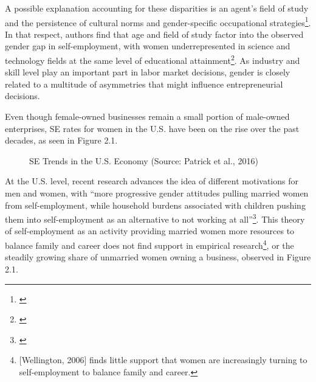 A possible explanation accounting for these disparities is an agent's field of study and the persistence of cultural norms and gender-specific occupational strategies\footnote{\cite{CowlingTaylor2001}}. In that respect, authors find that age and field of study factor into the observed gender gap in self-employment, with women underrepresented in science and technology fields at the same level of educational attainment\footnote{\cite{GeorgellisWall2005}}. As industry and skill level play an important part in labor market decisions, gender is closely related to a multitude of asymmetries that might influence entrepreneurial decisions. 

Even though female-owned businesses remain a small portion of male-owned enterprises, SE rates for women in the U.S. have been on the rise over the past decades, as seen in Figure 2.1. 

\begin{figure}[hbtp]
    \caption{SE Trends in the U.S. Economy (Source: Patrick et al., 2016)} 
\end{figure}

At the U.S. level, recent research advances the idea of different motivations for men and women, with ``more progressive gender attitudes pulling married women from self-employment, while household burdens associated with children pushing them into self-employment as an alternative to not working at all''\footnote{\cite{PatrickStephensWeinstein2016}}. This theory of self-employment as an activity providing married women more resources to balance family and career does not find support in empirical research\footnote{[Wellington, 2006] finds little support that women are increasingly turning to self-employment to balance family and career.}, or the steadily growing share of unmarried women owning a business, observed in Figure 2.1.

